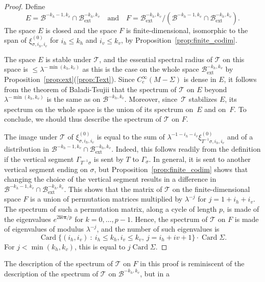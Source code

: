 \documentclass[JEP,XML,SOM,Unicode]{cedram}
\newcommand{\ext}{\mathrm{ext}}
\newcommand{\boB}{\mathcal{B}}
\newcommand{\boT}{\mathcal{T}}
\newcommand{\ic}{\mathbf{i}}
\newcommand{\bpi}{\boldsymbol{\pi}}
\newcommand{\st}{\::\:}
\DeclareMathOperator{\Card}{Card}
\theoremstyle{definition}
\numberwithin{equation}{section}
\begin{document}
\begin{proof}
Define
\[
E = \boB^{-k_h-1, k_v} \cap \boB^{-k_h, k_v}_{\ext}\quad\text{and}\quad F =
\boB_{\ext}^{-k_h, k_v}/(\boB^{-k_h-1, k_v} \cap \boB^{-k_h, k_v}_{\ext}).
\]
The
space $E$ is closed and the space $F$ is finite-dimensional, isomorphic to
the span of $\xi^{(0)}_{\sigma, i_h, i_v}$ for $i_h \leq k_h$ and $i_v\leq
k_v$, by Proposition~\ref{prop:finite_codim}.

The space $E$ is stable under $\boT$, and the essential spectral radius of
$\boT$ on this space is $\leq \lambda^{-\min(k_h, k_v)}$ as this is the case
on the whole space $\boB_{\ext}^{-k_h, k_v}$ by
Proposition~\ref{prop:ext}(\ref{prop:Text}). Since $C^\infty_c(M-\Sigma)$ is
dense in $E$, it follows from the theorem of Baladi-Tsujii that the spectrum
of $\boT$ on $E$ beyond $\lambda^{-\min(k_h, k_v)}$ is the same as on
$\boB^{-k_h, k_v}$. Moreover, since~$\boT$ stabilizes $E$, its spectrum on
the whole space is the union of its spectrum on~$E$ and on~$F$. To conclude,
we should thus describe the spectrum of $\boT$ on $F$.

The image under $\boT$ of $\xi^{(0)}_{\sigma, i_h, i_v}$ is equal to the sum
of $\lambda^{-1-i_h-i_v} \xi^{(0)}_{T^{-1}\sigma, i_h, i_v}$ and of a
distribution in $\boB^{-k_h-1, k_v} \cap \boB^{-k_h, k_v}_{\ext}$. Indeed,
this follows readily from the definition if the vertical segment
$\Gamma_{T^{-1}\sigma}$ is sent by $T$ to $\Gamma_\sigma$. In general, it is
sent to another vertical segment ending on $\sigma$, but
Proposition~\ref{prop:finite_codim} shows that changing the choice of the
vertical segment results in a difference in $\boB^{-k_h-1, k_v} \cap
\boB_{\ext}^{-k_h, k_v}$. This shows that the matrix of $\boT$ on the
finite-dimensional space $F$ is a union of permutation matrices multiplied by
$\lambda^{-j}$ for $j=1+i_h+i_v$. The spectrum of such a permutation matrix,
along a cycle of length $p$, is made of the eigenvalues $e^{2\ic k\bpi/p}$
for $k=0,\dotsc, p-1$. Hence, the spectrum of $\boT$ on $F$ is made of
eigenvalues of modulus $\lambda^{-j}$, and the number of such eigenvalues is
\begin{equation*}
\Card \{(i_h, i_v) \st i_h \leq k_h, i_v \leq k_v, \ j = i_h+iv+1\} \cdot \Card\Sigma.
\end{equation*}
For $j < \min(k_h, k_v)$, this is equal to $j \Card \Sigma$.
\end{proof}
The description of the spectrum of $\boT$ on $F$ in this proof is reminiscent
of the description of the spectrum of $\boT$ on $\boB^{-k_h, k_v}$, but in a
\end{document}
